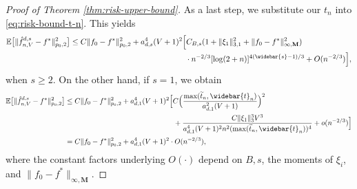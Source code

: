 \documentclass[10pt]{article}
\newcommand{\E}{{\mathbb E}}
\newcommand{\lsefstinf}{{\hat{f}^{d, s}_{n, V}}}
\newcommand{\Mbf}{{\mathbf{M}}}
\begin{document}
\begin{proof}[Proof of Theorem \ref{thm:risk-upper-bound}]
As a last step, we substitute our $t_n$ into \eqref{eq:risk-bound-t-n}. 
This yields
\begin{equation*}
\begin{aligned}
    &\E\big[\|\lsefstinf - f^*\|_{p_0, 2}^2\big] 
    \le  C \|f_0 - f^*\|_{p_0, 2}^2 
    + a_{d, s}^4 (V + 1)^2 \Big[C_{B, s} 
    (1 + \|\xi_1\|_{3, 1}^2 + \|f_0 - f^*\|_{\infty, \Mbf}^2) \\
    &\qquad \qquad \qquad \qquad \qquad \qquad \qquad \qquad \qquad \qquad
    \qquad \quad
    \cdot n^{-2/3} [\log(2 + n)]^{4(\widebar{s} - 1)/3} + O(n^{-2/3})\Big],
\end{aligned}
\end{equation*}
when $s \ge 2$. On the other hand, if $s = 1$, we obtain
\begin{equation*}
\begin{aligned}
    \E\big[\|\lsefstinf - f^*\|_{p_0, 2}^2\big] 
    &\le C\|f_0 - f^*\|_{p_0, 2}^2 
    + a_{d, 1}^4 (V + 1)^2 \Big[C\Big(\frac{\max(\widetilde{t}_n, 
    \widebar{t}_n)}{a_{d, 1}^2 (V + 1)}\Big)^2 \\
    &\qquad \qquad \qquad \qquad \qquad \qquad \qquad \quad 
    + \frac{C\|\xi_1\|_3^3 V^3}{a_{d, 1}^4 (V + 1)^2 n^2 
    (\max(\widetilde{t}_n, \widebar{t}_n))^4} + o(n^{-2/3})\Big] \\
    &= C\|f_0 - f^*\|_{p_0, 2}^2 
    + a_{d, 1}^4 (V + 1)^2 \cdot O(n^{-2/3}),
\end{aligned}
\end{equation*}
where the constant factors underlying $O(\cdot)$ 
depend on $B, s$, the moments of $\xi_i$, and 
$\|f_0 - f^*\|_{\infty, \Mbf}$.
\end{proof}
    
\end{document}
